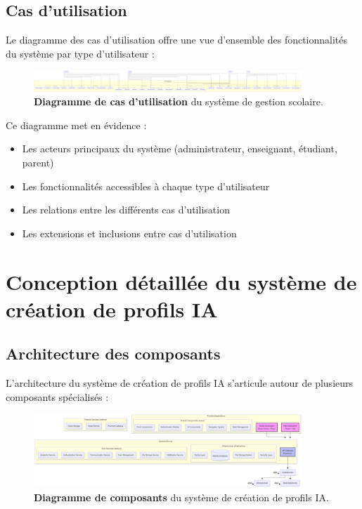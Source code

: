 \subsection{Cas d'utilisation}

Le diagramme des cas d'utilisation offre une vue d'ensemble des fonctionnalités du système par type d'utilisateur :

\begin{figure}[H]
  \centering
  \includegraphics[width=0.9\textwidth,keepaspectratio]{pfe-pics/diagrames/usecase.png}
  \caption{\textbf{Diagramme de cas d'utilisation} du système de gestion scolaire.}
  \label{fig:use_cases}
\end{figure}

Ce diagramme met en évidence :

\begin{itemize}
  \item Les acteurs principaux du système (administrateur, enseignant, étudiant, parent)
  
  \item Les fonctionnalités accessibles à chaque type d'utilisateur
  
  \item Les relations entre les différents cas d'utilisation
  
  \item Les extensions et inclusions entre cas d'utilisation
\end{itemize}

\section{Conception détaillée du système de création de profils IA}

\subsection{Architecture des composants}

L'architecture du système de création de profils IA s'articule autour de plusieurs composants spécialisés :

\begin{figure}[H]
  \centering
  \includegraphics[width=0.9\textwidth,keepaspectratio]{pfe-pics/diagrames/Component Diagram (showing the system_s architecture).png}
  \caption{\textbf{Diagramme de composants} du système de création de profils IA.}
  \label{fig:ai_components}
\end{figure}

